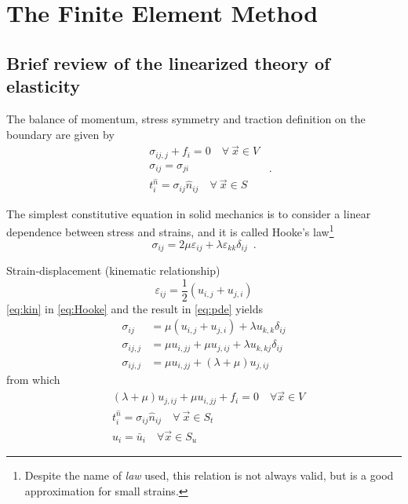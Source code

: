 \chapter{The Finite Element Method}

\section{Brief review of the linearized theory of elasticity}
The balance of momentum, stress symmetry and traction definition on the boundary are given by
\begin{equation} \label{eq:pde}
\begin{split}
&{\sigma _{ij,j}} + {f_i} = 0 \quad \forall\ \vec{x} \in V\\
 &\sigma _{ij}=\sigma _{ji}\\
& t_i^{\hat n} = {\sigma _{ij}}{\hat n_{ij}} \quad \forall\ \vec{x} \in S
\end{split} \enspace .
\end{equation}


The simplest constitutive equation in solid mechanics is to consider a linear dependence between stress and strains, and it is called Hooke's law\footnote{Despite the name of \emph{law} used, this relation is not always valid, but is a good approximation for small strains.}
\begin{equation} \label{eq:Hooke}
{\sigma _{ij}} = 2\mu {\varepsilon _{ij}} + \lambda {\varepsilon _{kk}}{\delta _{ij}} \enspace .
\end{equation}

Strain-displacement (kinematic relationship)
\begin{equation}\label{eq:kin}
{\varepsilon _{ij}} = \frac{1}{2}\left( u_{i,j} + u_{j,i}\right)
\end{equation}
\cref{eq:kin} in \cref{eq:Hooke} and the result in \cref{eq:pde} yields
\begin{align*}
\sigma _{ij} &= \mu \left( u_{i,j} + u_{j,i}\right) + \lambda u_{k,k}\delta _{ij}\\
\sigma_{ij,j} &= \mu u_{i,jj} + \mu u_{j,ij} + \lambda u_{k,kj}\delta_{ij}\\
\sigma_{ij,j} &= \mu u_{i,jj} + \left(\lambda  + \mu\right) u_{j,ij}
\end{align*}
from which
\begin{equation} \label{eq:navier}
\begin{split}
&\left(\lambda  + \mu \right)u_{j,ij} + \mu u_{i,jj} + {f_i} = 0 \quad \forall \vec{x} \in V \\
&t_i^{\hat n} = \sigma _{ij} \hat n_{ij} \quad \forall\ \vec{x} \in S_t\\
& {u_i} = \bar{u}_i \quad \forall \vec x \in S_u
\end{split}
\end{equation}


